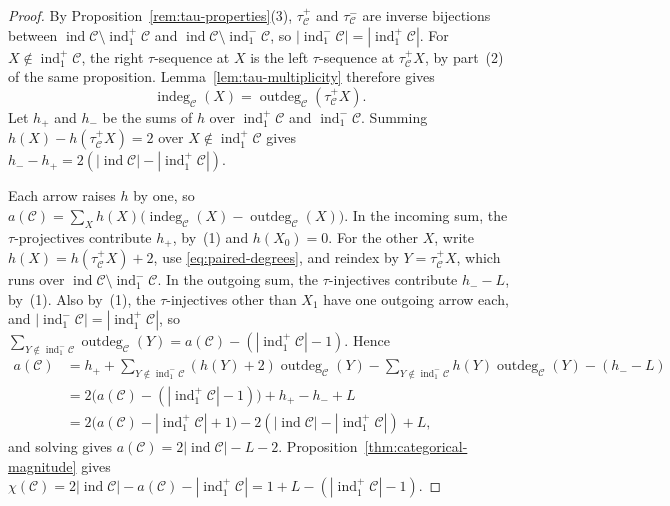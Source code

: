\documentclass[a4paper,reqno,10pt]{amsart}
\theoremstyle{definition}
\numberwithin{equation}{section}
\DeclareMathOperator{\ind}{ind}
\newcommand{\cC}{\mathcal C}
\newcommand{\indeg}{\operatorname{indeg}}
\newcommand{\outdeg}{\operatorname{outdeg}}
\begin{document}
\begin{proof}
By Proposition~\ref{rem:tau-properties}(3), \(\tau_{\cC}^+\) and
\(\tau_{\cC}^-\) are inverse bijections between
\(\ind\cC\setminus\ind_1^+\cC\) and
\(\ind\cC\setminus\ind_1^-\cC\), so
\(|\ind_1^-\cC|=|\ind_1^+\cC|\). For \(X\notin\ind_1^+\cC\), the right
\(\tau\)-sequence at \(X\) is the left \(\tau\)-sequence at
\(\tau_{\cC}^+X\), by part~(2) of the same proposition. Lemma~\ref{lem:tau-multiplicity}
therefore gives
\begin{equation}\label{eq:paired-degrees}
 \indeg_{\cC}(X)=\outdeg_{\cC}(\tau_{\cC}^+X).
\end{equation}
Let \(h_+\) and \(h_-\) be the sums of \(h\) over
\(\ind_1^+\cC\) and \(\ind_1^-\cC\). Summing
\(h(X)-h(\tau_{\cC}^+X)=2\) over \(X\notin\ind_1^+\cC\)
gives \(h_--h_+=2(|\ind\cC|-|\ind_1^+\cC|)\).

Each arrow raises \(h\) by one, so
\(a(\cC)=\sum_X h(X)\bigl(\indeg_{\cC}(X)-\outdeg_{\cC}(X)\bigr)\).
In the incoming sum, the \(\tau\)-projectives contribute \(h_+\), by~(1)
and \(h(X_0)=0\). For the other \(X\), write
\(h(X)=h(\tau_{\cC}^+X)+2\), use \eqref{eq:paired-degrees}, and
reindex by \(Y=\tau_{\cC}^+X\), which runs over
\(\ind\cC\setminus\ind_1^-\cC\). In the outgoing sum, the
\(\tau\)-injectives contribute \(h_--L\), by~(1). Also by~(1), the
\(\tau\)-injectives other than \(X_1\) have one outgoing arrow each, and
\(|\ind_1^-\cC|=|\ind_1^+\cC|\), so
\(\sum_{Y\notin\ind_1^-\cC}\outdeg_{\cC}(Y)=a(\cC)-(|\ind_1^+\cC|-1)\). Hence
\[
\begin{aligned}
 a(\cC)
 &=h_++\sum_{Y\notin\ind_1^-\cC}(h(Y)+2)\outdeg_{\cC}(Y)
   -\sum_{Y\notin\ind_1^-\cC}h(Y)\outdeg_{\cC}(Y)-(h_--L)\\
 &=2\bigl(a(\cC)-(|\ind_1^+\cC|-1)\bigr)+h_+-h_-+L\\
 &=2\bigl(a(\cC)-|\ind_1^+\cC|+1\bigr)-2(|\ind\cC|-|\ind_1^+\cC|)+L,
\end{aligned}
\]
and solving gives
\(a(\cC)=2|\ind\cC|-L-2\). Proposition~\ref{thm:categorical-magnitude} gives
\(\chi(\cC)=2|\ind\cC|-a(\cC)-|\ind_1^+\cC|=1+L-(|\ind_1^+\cC|-1)\).
\end{proof}
\end{document}
